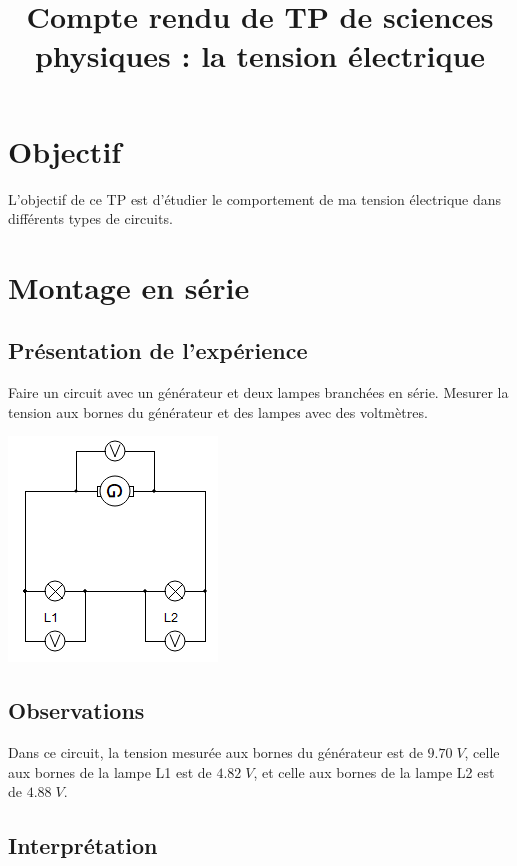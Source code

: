 \documentclass[12pt,a4paper]{article}
\title{Compte rendu de TP de sciences physiques : la tension électrique}
\date{}
\begin{document}
	
\maketitle

\section{Objectif}	
	L'objectif de ce TP est d'étudier le comportement de ma tension électrique dans différents types de circuits.


\section{Montage en série}	

\subsection{Présentation de l'expérience}

Faire un circuit avec un générateur et deux lampes branchées en série. Mesurer la tension aux bornes du générateur et des lampes avec des voltmètres.

\begin{center}
	\includegraphics[scale=0.9]{img/schema_serie}
\end{center}

\subsection{Observations}

Dans ce circuit, la tension mesurée aux bornes du générateur est de $\num{9.70} \; V$, celle aux bornes de la lampe L1 est de $\num{4.82} \; V$, et celle aux bornes de la lampe L2 est de $\num{4.88} \; V$.

\subsection{Interprétation}
\end{document}
